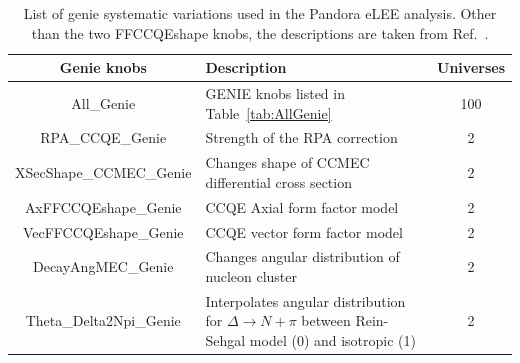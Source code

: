 \documentclass[a4paper]{article}
\begin{document}
\begin{table}[H]
\centering
 \begin{tabular}{| c | m{8cm} | c |} 
    \hline
\hline
Genie knobs & Description & Universes \\
\hline
All\_Genie        & GENIE knobs listed in Table~\ref{tab:AllGenie}   & 100\\
RPA\_CCQE\_Genie       & Strength of the RPA correction & 2\\
XSecShape\_CCMEC\_Genie     &  Changes shape of CCMEC differential cross section & 2\\ 
AxFFCCQEshape\_Genie   &  CCQE Axial form factor model & 2\\
VecFFCCQEshape\_Genie      &  CCQE vector form factor model & 2\\  
DecayAngMEC\_Genie        & Changes angular distribution of nucleon cluster  & 2\\ 
Theta\_Delta2Npi\_Genie       &  Interpolates angular distribution for $\Delta\to N+\pi$ between Rein-Sehgal model (0) and isotropic (1) & 2\\ 
\hline
\end{tabular}
\caption{List of genie systematic variations used in the Pandora eLEE analysis. Other than the two FFCCQEshape knobs, the descriptions are taken from Ref.~\cite{bib:geniesupportnote}.}
\label{tab:geniesyst}
\end{table}
\end{document}
